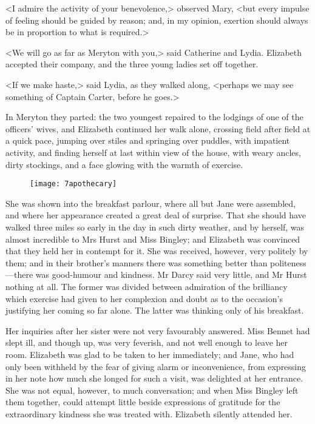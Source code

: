 <I admire the activity of your benevolence,> observed Mary, <but every impulse of feeling should be guided by reason; and, in my opinion, exertion should always be in proportion to what is required.>

<We will go as far as Meryton with you,> said Catherine and Lydia. Elizabeth accepted their company, and the three young ladies set off together.



<If we make haste,> said Lydia, as they walked along, <perhaps we may see something of Captain Carter, before he goes.>

In Meryton they parted: the two youngest repaired to the lodgings of one of the officers' wives, and Elizabeth continued her walk alone, crossing field after field at a quick pace, jumping over stiles and springing over puddles, with impatient activity, and finding herself at last within view of the house, with weary ancles, dirty stockings, and a face glowing with the warmth of exercise.

	\begin{figure}[bh]
\centering
\texttt{[image: 7apothecary]}
\end{figure}

She was shown into the breakfast parlour, where all but Jane were assembled, and where her appearance created a great deal of surprise. That she should have walked three miles so early in the day in such dirty weather, and by herself, was almost incredible to Mrs Hurst and Miss Bingley; and Elizabeth was convinced that they held her in contempt for it. She was received, however, very politely by them; and in their brother's manners there was something better than politeness—there was good-humour and kindness. Mr Darcy said very little, and Mr Hurst nothing at all. The former was divided between admiration of the brilliancy which exercise had given to her complexion and doubt as to the occasion's justifying her coming so far alone. The latter was thinking only of his breakfast.

Her inquiries after her sister were not very favourably answered. Miss Bennet had slept ill, and though up, was very feverish, and not well enough to leave her room. Elizabeth was glad to be taken to her immediately; and Jane, who had only been withheld by the fear of giving alarm or inconvenience, from expressing in her note how much she longed for such a visit, was delighted at her entrance. She was not equal, however, to much conversation; and when Miss Bingley left them together, could attempt little beside expressions of gratitude for the extraordinary kindness she was treated with. Elizabeth silently attended her.



